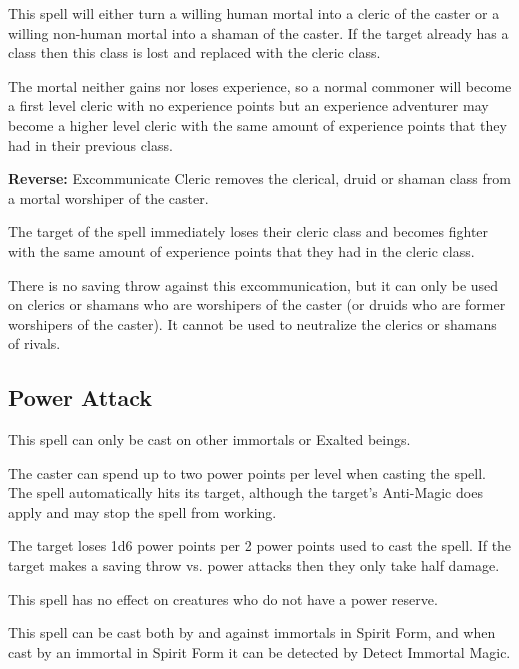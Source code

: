\begin{multicols*}{2}
This spell will either turn a willing human mortal into a cleric of the caster or a willing non-human mortal into a shaman of the caster. If the target already has a class then this class is lost and replaced with the cleric class.

The mortal neither gains nor loses experience, so a normal commoner will become a first level cleric with no experience points but an experience adventurer may become a higher level cleric with the same amount of experience points that they had in their previous class.

\textbf{Reverse:} Excommunicate Cleric removes the clerical, druid or shaman class from a mortal worshiper of the caster.

The target of the spell immediately loses their cleric class and becomes fighter with the same amount of experience points that they had in the cleric class.

There is no saving throw against this excommunication, but it can only be used on clerics or shamans who are worshipers of the caster (or druids who are former worshipers of the caster). It cannot be used to neutralize the clerics or shamans of rivals.

\subsection{Power Attack}\label{spell:Power Attack}

This spell can only be cast on other immortals or Exalted beings.

The caster can spend up to two power points per level when casting the spell. The spell automatically hits its target, although the target’s Anti-Magic does apply and may stop the spell from working.

The target loses 1d6 power points per 2 power points used to cast the spell. If the target makes a saving throw vs. power attacks then they only take half damage.

This spell has no effect on creatures who do not have a power reserve.

This spell can be cast both by and against immortals in Spirit Form, and when cast by an immortal in Spirit Form it can be detected by Detect Immortal Magic.


\end{multicols*}
